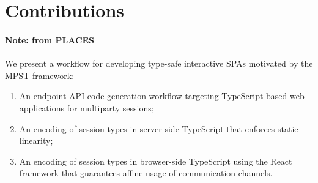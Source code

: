 \section{Contributions}

\paragraph{Note: from PLACES}

We present a workflow for developing type-safe interactive SPAs motivated by the MPST framework:

\begin{enumerate}
\item An endpoint API code generation workflow targeting TypeScript-based web applications for multiparty sessions;
\item An encoding of session types in server-side TypeScript that enforces static linearity;
\item An encoding of session types in browser-side TypeScript using the React framework that guarantees affine usage of communication channels.
\end{enumerate}